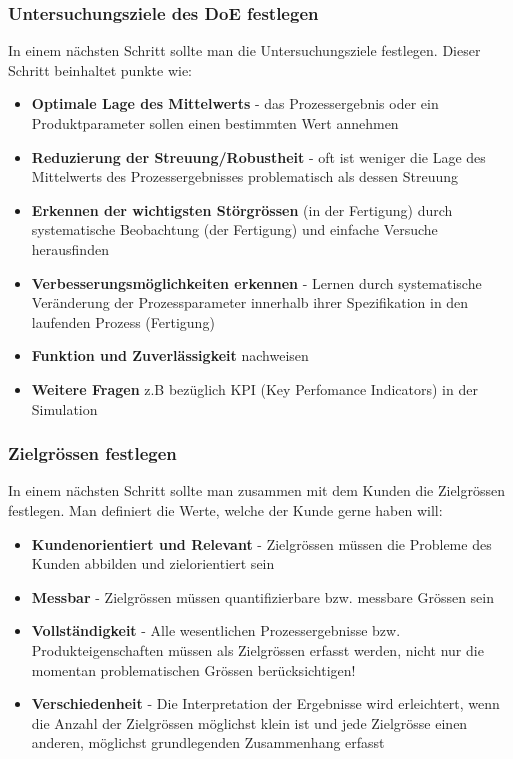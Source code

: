 
\subsubsection{Untersuchungsziele des DoE festlegen }
In einem nächsten Schritt sollte man die Untersuchungsziele festlegen. Dieser Schritt beinhaltet punkte wie:
\begin{itemize}
    \item \textbf{Optimale Lage des Mittelwerts} - das Prozessergebnis oder ein Produktparameter sollen einen bestimmten Wert annehmen 
    \item \textbf{Reduzierung der Streuung/Robustheit} - oft ist weniger die Lage des Mittelwerts des Prozessergebnisses problematisch als dessen Streuung 
    \item \textbf{Erkennen der wichtigsten Störgrössen} (in der Fertigung) durch systematische Beobachtung (der Fertigung) und einfache Versuche herausfinden 
    \item \textbf{Verbesserungsmöglichkeiten erkennen} - Lernen durch systematische Veränderung der Prozessparameter innerhalb ihrer Spezifikation in den laufenden Prozess (Fertigung)
    \item \textbf{Funktion und Zuverlässigkeit} nachweisen
    \item \textbf{Weitere Fragen} z.B bezüglich KPI (Key Perfomance Indicators) in der Simulation
\end{itemize}

\subsubsection{Zielgrössen festlegen}
In einem nächsten Schritt sollte man zusammen mit dem Kunden die Zielgrössen festlegen. Man definiert die Werte, welche der Kunde gerne haben will:
\begin{itemize}
    \item \textbf{Kundenorientiert und Relevant} - Zielgrössen müssen die Probleme des Kunden abbilden und zielorientiert sein
    \item \textbf{Messbar} - Zielgrössen müssen quantifizierbare bzw. messbare Grössen sein
    \item \textbf{Vollständigkeit} - Alle wesentlichen Prozessergebnisse bzw. Produkteigenschaften müssen als Zielgrössen erfasst werden, nicht nur die momentan problematischen Grössen berücksichtigen!
    \item \textbf{Verschiedenheit} - Die Interpretation der Ergebnisse wird erleichtert, wenn die Anzahl der Zielgrössen möglichst klein ist und jede Zielgrösse einen anderen, möglichst grundlegenden Zusammenhang erfasst
\end{itemize}

